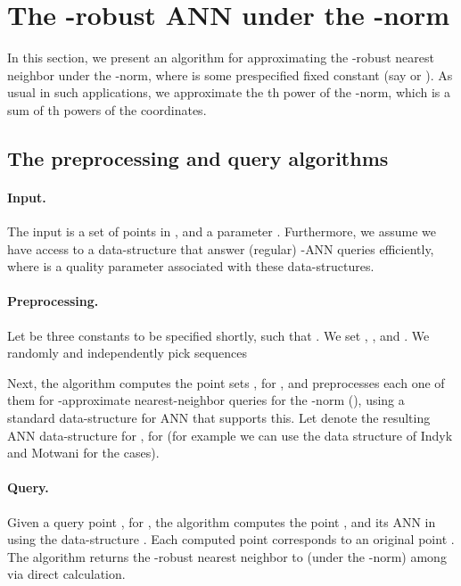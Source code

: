 \documentclass[12pt]{article}\usepackage[cm]{fullpage}
\newcommand{\Term}[1]{\textsf{#1}}
\theoremstyle{remark}\theoremheaderfont{\sf}\theorembodyfont{\upshape}\newtheorem{defn}[theorem]{Definition}
\numberwithin{figure}{section}\numberwithin{table}{section}\numberwithin{equation}{section}
\newcommand{\HLink}[2]{\hyperref[#2]{#1~\ref*{#2}}}
\newcommand{\HLinkPage}[2]{\hyperref[#2]{#1~\ref*{#2}}}
\newcommand{\seclab}[1]{\label{sec:#1}} \newcommand{\secref}[1]{\HLink{Section}{sec:#1}} \newcommand{\secrefpage}[1]{\HLinkPage{Section}{sec:#1}}
\renewcommand{\th}{th\xspace}
\newcommand{\ANN}{\Term{ANN}\xspace}\newcommand{\NN}{\Term{NN}\xspace}
\begin{document}
\section{The -robust \ANN under the -norm}
\seclab{sec:lp:case}

In this section, we present an algorithm for approximating the
-robust nearest neighbor under the -norm, where  is some
prespecified fixed constant (say  or ). As usual in such
applications, we approximate the \th power of the -norm,
which is a sum of \th powers of the coordinates.

\subsection{The preprocessing and query algorithms}
\seclab{sec:lp:alg} 

\paragraph{Input.}
The input is a set  of  points in , and a parameter
.  Furthermore, we assume we have access to a data-structure that
answer (regular) -\ANN queries efficiently, where
 is a quality parameter associated with these
data-structures.


\paragraph{Preprocessing.}  Let  be three constants to be specified
shortly, such that .  We set
, , and
. We randomly and independently
pick  sequences

Next, the algorithm computes the point sets
, for , and
preprocesses each one of them for -approximate
nearest-neighbor queries for the -norm (), using
a standard data-structure for \ANN that supports this.  Let 
denote the resulting \ANN data-structure for , for
 (for example we can use the data structure of
Indyk and Motwani \cite{im-anntr-98,him-anntr-12} for the 
cases).

\paragraph{Query.} Given a query point , for ,
the algorithm computes the point , and its
\ANN  in  using the data-structure . Each
computed point  corresponds to an original point
. The algorithm returns the -robust nearest
neighbor to  (under the -norm) among
 via direct calculation.
\end{document}
